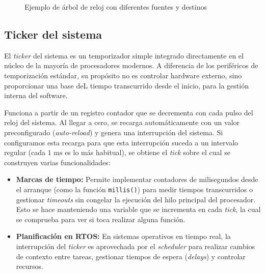 \documentclass[../main.tex]{subfiles}
\begin{document}
\begin{figure}
            \caption{Ejemplo de árbol de reloj con diferentes fuentes y destinos}
            \label{fig:clocktree}
        \end{figure}

    \subsection{Ticker del sistema}

        El \emph{ticker} del sistema es un temporizador simple integrado directamente en el núcleo de la mayoría de procesadores modernos. A diferencia de los periféricos de temporización estándar, su propósito no es controlar hardware externo, sino proporcionar una base deL tiempo transcurrido desde el inicio, para la gestión interna del software.

        Funciona a partir de un registro contador que se decrementa con cada pulso del reloj del sistema. Al llegar a cero, se recarga automáticamente con un valor preconfigurado (\emph{auto-reload}) y genera una interrupción del sistema. Si configuramos esta recarga para que esta interrupción suceda a un intervalo regular (cada $1\text{ ms}$ es lo más habitual), se obtiene el \emph{tick} sobre el cual se construyen varias funcionalidades:

        \begin{itemize}
            \item \textbf{Marcas de tiempo:} Permite implementar contadores de milisegundos desde el arranque (como la función \texttt{millis()}) para medir tiempos transcurridos o gestionar \emph{timeouts} sin congelar la ejecución del hilo principal del procesador. Esto se hace manteniendo una variable que se incrementa en cada \emph{tick}, la cual se comprueba para ver si toca realizar alguna función.
            \item \textbf{Planificación en RTOS:} En sistemas operativos en tiempo real, la interrupción del \emph{ticker} es aprovechada por el \emph{scheduler} para realizar cambios de contexto entre tareas, gestionar tiempos de espera (\emph{delays}) y controlar recursos.
        \end{itemize}
\end{document}
